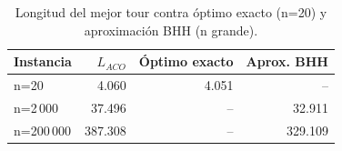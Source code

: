 \begin{table}[H]\centering
\caption{Longitud del mejor tour contra óptimo exacto (n=20) y aproximación BHH (n grande).}
\label{tab:longitud_referencias}
\begin{tabular}{lrrr}\toprule
\rowcolor{gray!25}
\textbf{Instancia} & \textbf{$L_{ACO}$} & \textbf{Óptimo exacto} & \textbf{Aprox. BHH} \\\midrule
n=20 & 4.060 & 4.051 & -- \\
n=2\,000 & 37.496 & -- & 32.911 \\
n=200\,000 & 387.308 & -- & 329.109 \\
\bottomrule\end{tabular}\end{table}

